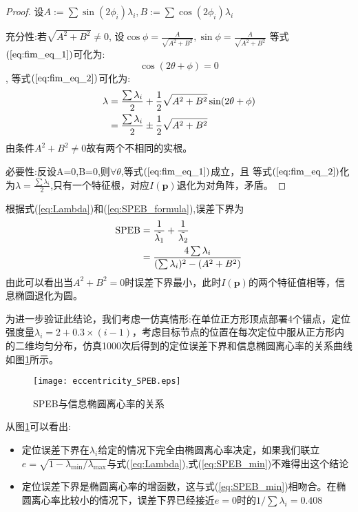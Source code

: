 \begin{proof}
设$A:=\sum\sin(2\phi_i)\lambda_i,B:=\sum\cos(2\phi_i)\lambda_i$

充分性:若$\sqrt{A^2+B^2} \neq 0$,
设$\cos\phi=\frac{A}{\sqrt{A^2+B^2}},\sin\phi=\frac{A}{\sqrt{A^2+B^2}}$
等式$(\ref{eq:fim_eq_1})$可化为:\[
\cos(2\theta+\phi)=0
\],
等式$(\ref{eq:fim_eq_2})$可化为:
\begin{align}\notag\label{eq:Lambda}
\lambda&=\frac{\sum \lambda_i}{2}+\frac{1}{2}\sqrt{A^2+B^2}\sin(2\theta+\phi)\\
&=\frac{\sum \lambda_i}{2}\pm\frac{1}{2}\sqrt{A^2+B^2}
\end{align}
由条件$A^2+B^2\neq 0$故有两个不相同的实根。

必要性:反设A=0,B=0,则$\forall \theta$,等式$(\ref{eq:fim_eq_1})$成立，且
等式$(\ref{eq:fim_eq_2})$化为$\lambda=\frac{\sum \lambda_i}{2}$,只有一个特征根，对应$I(\bm{p})$退化为对角阵，矛盾。
\end{proof}
根据式(\ref{eq:Lambda})和(\ref{eq:SPEB_formula}),误差下界为
\begin{align}\notag\label{eq:SPEB_min}
\text{SPEB}&=\frac{1} {\tilde{\lambda_1}}+\frac{1}{\tilde{\lambda_2}}\\
&=\frac{4\sum \lambda_i}{(\sum \lambda_i)^2-(A^2+B^2)}
\end{align}
由此可以看出当$A^2+B^2=0$时误差下界最小，此时$I(\bm{p})$的两个特征值相等，信息椭圆退化为圆。

为进一步验证此结论，我们考虑一仿真情形:在单位正方形顶点部署4个锚点，定位强度量$\lambda_i=2+0.3\times(i-1)$，考虑目标节点的位置在每次定位中服从正方形内的二维均匀分布，仿真1000次后得到的定位误差下界和信息椭圆离心率的关系曲线如图\ref{fig:eccentricity}所示。
\begin{figure}
  \centering
  \texttt{[image: eccentricity\_SPEB.eps]}
  \caption{SPEB与信息椭圆离心率的关系}\label{fig:eccentricity}
\end{figure}
从图\ref{fig:eccentricity}可以看出:
\begin{itemize}
  \item 定位误差下界在$\lambda_i$给定的情况下完全由椭圆离心率决定，如果我们联立$e=\sqrt{1-\lambda_{\min}/\lambda_{\max}}$与式(\ref{eq:Lambda}),式(\ref{eq:SPEB_min})不难得出这个结论
  \item 定位误差下界是椭圆离心率的增函数，这与式(\ref{eq:SPEB_min})相吻合。在椭圆离心率比较小的情况下，误差下界已经接近$e=0$时的$1/\sum \lambda_i=0.408$
\end{itemize}
